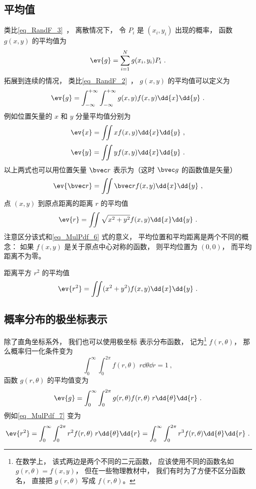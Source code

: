 \subsection{平均值}
类比\autoref{eq_RandF_3}~， 离散情况下， 令 $P_i$ 是 $(x_i, y_i)$ 出现的概率， 函数 $g(x,y)$ 的平均值为
\begin{equation}
\ev{g} = \sum_{i=1}^N g(x_i, y_i) P_i~.
\end{equation}
拓展到连续的情况， 类比\autoref{eq_RandF_2}~， $g(x, y)$ 的平均值可以定义为
\begin{equation}
\ev{g} =  \int_{-\infty}^{+\infty} \int_{-\infty}^{+\infty} g(x, y) f(x, y) \dd{x} \dd{y}~.
\end{equation}
例如位置矢量的 $x$ 和 $y$ 分量平均值分别为
\begin{equation}\label{eq_MulPdf_2}
\ev{x} = \iint x f(x, y) \dd{x}\dd{y}~,
\end{equation}
\begin{equation}
\ev{y} = \iint y f(x, y) \dd{x}\dd{y}~.
\end{equation}
以上两式也可以用位置矢量 $\bvec r$ 表示为（这时 $\bvec g$ 的函数值是矢量）
\begin{equation}\label{eq_MulPdf_6}
\ev{\bvec r} = \iint \bvec r f(x, y) \dd{x}\dd{y}~,
\end{equation}
点 $(x,y)$ 到原点距离的距离 $r$ 的平均值
\begin{equation}
\ev{r} = \iint \sqrt{x^2 + y^2} f(x, y) \dd{x}\dd{y}~.
\end{equation}
注意区分该式和\autoref{eq_MulPdf_6} 式的意义， 平均位置和平均距离是两个不同的概念： 如果 $f(x, y)$ 是关于原点中心对称的函数， 则平均位置为 $(0, 0)$， 而平均距离不为零。

距离平方 $r^2$ 的平均值
\begin{equation}\label{eq_MulPdf_7}
\ev{r^2} = \iint (x^2 + y^2) f(x, y) \dd{x}\dd{y}~.
\end{equation}

\subsection{概率分布的极坐标表示}

除了直角坐标系外， 我们也可以使用极坐标 表示分布函数， 记为\footnote{在数学上， 该式两边是两个不同的二元函数， 应该使用不同的函数名如 $g(r, \theta) = f(x, y)$， 但在一些物理教材中， 我们有时为了方便不区分函数名， 直接把 $g(r, \theta)$ 写成 $f(r, \theta)$。} $f(r, \theta)$， 那么概率归一化条件变为
\begin{equation}\label{eq_MulPdf_1}
\int_0^\infty \int_{0}^{2\pi} f(r, \theta)\,\, r\dd{\theta}\dd{r} = 1~,
\end{equation}
函数 $g(r, \theta)$ 的平均值变为
\begin{equation}
\ev{g} = \int_0^\infty \int_{0}^{2\pi} g(r, \theta) f(r, \theta)\,\, r\dd{\theta}\dd{r}~.
\end{equation}
例如\autoref{eq_MulPdf_7} 变为
\begin{equation}\label{eq_MulPdf_3}
\ev{r^2} = \int_0^\infty \int_{0}^{2\pi} r^2 f(r, \theta)\,\, r\dd{\theta}\dd{r}
= \int_0^\infty \int_{0}^{2\pi} r^3 f(r, \theta) \dd{\theta}\dd{r}~.
\end{equation}

